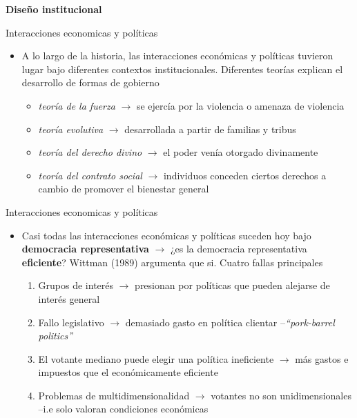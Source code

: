 \documentclass[
  ignorenonframetext,
]{beamer}
\providecommand{\tightlist}{%
  \setlength{\itemsep}{0pt}\setlength{\parskip}{0pt}}\usepackage{longtable,booktabs,array}
\begin{document}
\begin{frame}{\textbf{Diseño institucional}}
\protect\hypertarget{diseuxf1o-institucional}{}
\begin{block}{Interacciones economicas y políticas}
\protect\hypertarget{interacciones-economicas-y-poluxedticas}{}
\begin{itemize}
\tightlist
\item
  A lo largo de la historia, las interacciones económicas y políticas
  tuvieron lugar bajo diferentes contextos institucionales. Diferentes
  teorías explican el desarrollo de formas de gobierno

  \begin{itemize}
  \tightlist
  \item
    \emph{teoría de la fuerza} \(\longrightarrow\) se ejercía por la
    violencia o amenaza de violencia
  \item
    \emph{teoría evolutiva} \(\longrightarrow\) desarrollada a partir de
    familias y tribus
  \item
    \emph{teoría del derecho divino} \(\longrightarrow\) el poder venía
    otorgado divinamente
  \item
    \emph{teoría del contrato social} \(\longrightarrow\) individuos
    conceden ciertos derechos a cambio de promover el bienestar general
  \end{itemize}
\end{itemize}
\end{block}

\begin{block}{Interacciones economicas y políticas}
\protect\hypertarget{interacciones-economicas-y-poluxedticas-1}{}
\begin{itemize}
\tightlist
\item
  Casi todas las interacciones económicas y políticas suceden hoy bajo
  \textbf{democracia representativa} \(\longrightarrow\) ¿es la
  democracia representativa \textbf{eficiente}? Wittman (1989) argumenta
  que si. Cuatro fallas principales

  \begin{enumerate}
  \tightlist
  \item
    Grupos de interés \(\longrightarrow\) presionan por políticas que
    pueden alejarse de interés general
  \item
    Fallo legislativo \(\longrightarrow\) demasiado gasto en política
    clientar --\emph{``pork-barrel politics''}
  \item
    El votante mediano puede elegir una política ineficiente
    \(\longrightarrow\) más gastos e impuestos que el económicamente
    eficiente
  \item
    Problemas de multidimensionalidad \(\longrightarrow\) votantes no
    son unidimensionales --i.e solo valoran condiciones económicas
  \end{enumerate}
\end{itemize}
\end{block}


\end{frame}
\end{document}
